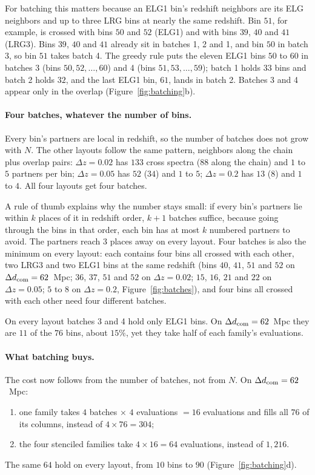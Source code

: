 \documentclass[11pt]{article}
\begin{document}
For batching this matters because an ELG1 bin's redshift neighbors are
its ELG neighbors and up to three LRG bins at nearly the same redshift.
Bin $51$, for example, is crossed with bins $50$ and $52$ (ELG1) and
with bins $39$, $40$ and $41$ (LRG3).  Bins $39$, $40$ and $41$ already
sit in batches 1, 2 and 1, and bin $50$ in batch 3, so bin
$51$ takes batch 4.  The greedy rule puts the eleven ELG1 bins $50$ to
$60$ in batches 3 (bins $50, 52, \ldots, 60$) and 4 (bins
$51, 53, \ldots, 59$); batch 1 holds $33$ bins and batch 2 holds $32$,
and the last ELG1 bin, $61$, lands in batch 2.  Batches 3 and 4 appear
only in the overlap (Figure~\ref{fig:batching}b).

\paragraph{Four batches, whatever the number of bins.}
Every bin's partners are local in redshift, so the number of batches
does not grow with $N$.  The other layouts follow the same pattern,
neighbors along the chain plus overlap pairs: $\Delta z = 0.02$ has
$133$ cross spectra ($88$ along the chain) and $1$ to $5$ partners per
bin; $\Delta z = 0.05$ has $52$ ($34$) and $1$ to $5$; $\Delta z = 0.2$
has $13$ ($8$) and $1$ to $4$.  All four layouts get four batches.

A rule of thumb explains why the number stays small: if every bin's
partners lie within $k$ places of it in redshift order, $k + 1$ batches
suffice, because going through the bins in that order, each bin has at
most $k$ numbered partners to avoid.  The partners reach $3$ places
away on every layout.  Four batches is also the minimum on every
layout: each contains four bins all crossed with each other, two LRG3
and two ELG1 bins at the same redshift (bins $40$, $41$, $51$ and $52$
on $\Delta d_{\rm com} = 62$~Mpc; $36$, $37$, $51$ and $52$ on
$\Delta z = 0.02$; $15$, $16$, $21$ and $22$ on $\Delta z = 0.05$; $5$
to $8$ on $\Delta z = 0.2$, Figure~\ref{fig:batches}), and four bins
all crossed with each other need four different batches.

On every layout batches 3 and 4 hold only ELG1 bins.  On
$\Delta d_{\rm com} = 62$~Mpc they are $11$ of the $76$ bins, about
$15\%$, yet they take half of each family's evaluations.

\paragraph{What batching buys.}
The cost now follows from the number of batches, not from $N$.  On
$\Delta d_{\rm com} = 62$~Mpc:
\begin{enumerate}
  \item one family takes $4$ batches $\times$ $4$ evaluations $= 16$
    evaluations and fills all $76$ of its columns, instead of
    $4 \times 76 = 304$;
  \item the four stenciled families take $4 \times 16 = 64$
    evaluations, instead of $1{,}216$.
\end{enumerate}
The same $64$ hold on every layout, from $10$ bins to $90$
(Figure~\ref{fig:batching}d).
\end{document}
